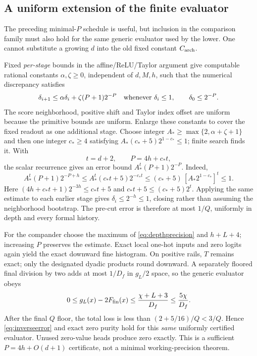 \documentclass[11pt,letterpaper]{article}
\theoremstyle{definition}\newtheorem{definition}[theorem]{Definition}
\theoremstyle{remark}\newtheorem{remark}[theorem]{Remark}
\begin{document}
\subsection{A uniform extension of the finite evaluator}
The preceding minimal-$P$ schedule is useful, but inclusion in the comparison family must also hold for the same generic evaluator used by the lower. One cannot substitute a growing $d$ into the old fixed constant $C_{\rm arch}$.

Fixed \emph{per-stage} bounds in the affine/ReLU/Taylor argument give computable rational constants $\alpha,\zeta\ge0$, independent of $d,M,h$, such that the numerical discrepancy satisfies
\[
 \delta_{i+1}\le\alpha\delta_i+\zeta(P+1)2^{-P}
 \quad\hbox{whenever }\delta_i\le1,\qquad
 \delta_0\le2^{-P}.
\]
The score neighborhood, positive shift and Taylor index offset are uniform because the primitive bounds are uniform. Enlarge these constants to cover the fixed readout as one additional stage. Choose integer $A_*\ge\max\{2,\alpha+\zeta+1\}$ and then one integer $c_*\ge4$ satisfying
$A_*(c_*+5)2^{1-c_*}\le1$; finite search finds it. With
\begin{equation}\label{eq:depthprecision}
 t=d+2,\qquad P=4h+c_*t,
\end{equation}
the scalar recurrence gives an error bound $A_*^t(P+1)2^{-P}$. Indeed,
\[
 A_*^t(P+1)2^{-P+h}
 \le A_*^t(c_*t+5)2^{-c_*t}
 \le(c_*+5)\,[A_*2^{1-c_*}]^t\le1.
\]
Here $(4h+c_*t+1)2^{-3h}\le c_*t+5$ and
$c_*t+5\le(c_*+5)2^t$. Applying the same estimate to each earlier stage gives $\delta_i\le2^{-h}\le1$, closing rather than assuming the neighborhood bootstrap. The pre-cut error is therefore at most $1/Q$, uniformly in depth and every formal history.

For the compander choose the maximum of \eqref{eq:depthprecision} and $h+L+4$; increasing $P$ preserves the estimate. Exact local one-hot inputs and zero logits again yield the exact downward fine histogram. On positive rails, $T$ remains exact; only the designated dyadic products round downward. A separately floored final division by two adds at most $1/D_f$ in $g_L/2$ space, so the generic evaluator obeys
\[
 0\le g_L(x)-2F_{\rm fin}(x)
 \le\frac{\chi+L+3}{D_f}\le\frac{5\chi}{D_f}.
\]
After the final $Q$ floor, the total loss is less than $(2+5/16)/Q<3/Q$. Hence \eqref{eq:inverseerror} and exact zero purity hold for this \emph{same} uniformly certified evaluator. Unused zero-value heads produce zero exactly. This is a sufficient $P=4h+O(d+1)$ certificate, not a minimal working-precision theorem.
\end{document}
